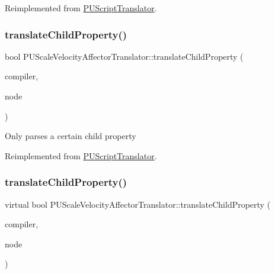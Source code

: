 Reimplemented from \hyperlink{classPUScriptTranslator_ab587d01348ae3e678cb700c719b2b113}{P\+U\+Script\+Translator}.

\mbox{\label{classPUScaleVelocityAffectorTranslator_ad541f431edad9fd9ca4ed6db6e44731d}} 
\subsubsection{\texorpdfstring{translate\+Child\+Property()}{translateChildProperty()}\hspace{0.1cm}{\footnotesize\ttfamily [1/2]}}
{\footnotesize\ttfamily bool P\+U\+Scale\+Velocity\+Affector\+Translator\+::translate\+Child\+Property (\begin{DoxyParamCaption}\item[{\hyperlink{classPUScriptCompiler}{P\+U\+Script\+Compiler} $\ast$}]{compiler,  }\item[{\hyperlink{classPUAbstractNode}{P\+U\+Abstract\+Node} $\ast$}]{node }\end{DoxyParamCaption})\hspace{0.3cm}{\ttfamily [virtual]}}

Only parses a certain child property 

Reimplemented from \hyperlink{classPUScriptTranslator_a0374d83a8a04e57918975d525e0f8fe8}{P\+U\+Script\+Translator}.

\mbox{\label{classPUScaleVelocityAffectorTranslator_a81af3ea61241fd6f6d575211043f27ea}} 
\subsubsection{\texorpdfstring{translate\+Child\+Property()}{translateChildProperty()}\hspace{0.1cm}{\footnotesize\ttfamily [2/2]}}
{\footnotesize\ttfamily virtual bool P\+U\+Scale\+Velocity\+Affector\+Translator\+::translate\+Child\+Property (\begin{DoxyParamCaption}\item[{\hyperlink{classPUScriptCompiler}{P\+U\+Script\+Compiler} $\ast$}]{compiler,  }\item[{\hyperlink{classPUAbstractNode}{P\+U\+Abstract\+Node} $\ast$}]{node }\end{DoxyParamCaption})\hspace{0.3cm}{\ttfamily [virtual]}}

